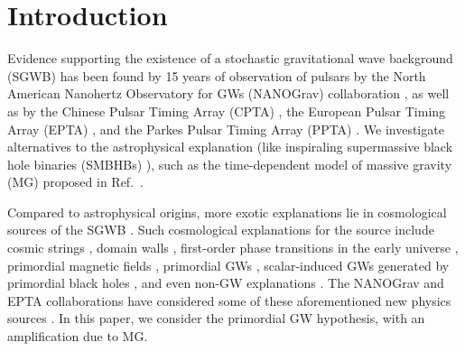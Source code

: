 \documentclass[prd,twocolumn,aps,psfig,nofootinbib,nobibnotes,superscriptaddress,preprintnumbers,times]{revtex4-2}
\begin{document}
\section{Introduction}
Evidence supporting the existence of a stochastic gravitational wave background (SGWB) has been found by 15 years of observation of pulsars by the North American Nanohertz Observatory for GWs (NANOGrav) collaboration \cite{Agazie:2023}, as well as by the Chinese Pulsar Timing Array (CPTA) \cite{Xu:2023wog}, the European Pulsar Timing Array (EPTA) \cite{EPTA:2023sfo, EPTA:2023akd, EPTA:2023fyk}, and the Parkes Pulsar Timing Array (PPTA) \cite{Zic:2023gta,Reardon:2023gzh}. We investigate alternatives to the astrophysical explanation (like inspiraling supermassive black hole binaries (SMBHBs) \cite{Rajagopal:1995,Jaffe:2002rt,Burke-Spolaor:2018bvk}), such as the time-dependent model of massive gravity (MG) proposed in Ref.\ \cite{Fujita:2018ehq}. 

Compared to astrophysical origins, more exotic explanations lie in cosmological sources of the SGWB  \cite{Maggiore:1999vm, Caprini:2018mtu, Chen:2021wdo, Wu:2021kmd, Chen:2021ncc, PPTA:2022eul, Wu:2023pbt, Wu:2023dnp, Madge:2023cak, Ellis:2023oxs}. Such cosmological explanations for the source include  cosmic strings \cite{Damour:2004kw,Siemens:2006yp, Chen:2022azo,Bian:2022tju}, domain walls \cite{Ferreira:2022zzo, Zhang:2023nrs}, first-order phase transitions in the early universe \cite{Kibble:1976sj, Vilenkin:1984ib,Caprini:2010xv, Kobakhidze:2017mru, Arunasalam:2017ajm, Xue:2021gyq, NANOGrav:2021flc, Moore:2021ibq, Addazi:2023jvg, Athron:2023xlk, Bringmann:2023opz, Ashoorioon:2022raz}, primordial magnetic fields \cite{Neronov:2020qrl,Brandenburg:2021tmp,RoperPol:2022iel,Kahniashvili:2021gym}, primordial GWs \cite{Grishchuk:1976, Grishchuk:1977zz, Starobinsky:1980te, Linde:1981mu, Fabbri:1983us, Grishchuk:2005qe, Lasky:2015lej, Kawai:2023nqs, Basilakos:2023xof, Basilakos:2023jvp}, scalar-induced GWs \cite{Tomita:1967non, Saito:2008jc, Young:2014ana, Yuan:2019udt, Yuan:2019wwo, Chen:2019xse, Cai:2019bmk, Yuan:2019fwv, Liu:2021jnw, Liu:2023ymk, Cai:2023dls, Choudhury:2023fjs, Choudhury:2023fwk, Bhattacharya:2023ysp, Choudhury:2023hfm, Kawai:2021edk} generated by primordial black holes \cite{Zeldovich:1967lct,Hawking:1971ei,Carr:1974nx,Chen:2018czv,Chen:2018rzo,Liu:2018ess,Liu:2019rnx,Chen:2019irf,Liu:2020cds,Wu:2020drm,Chen:2021nxo,Chen:2022fda,Chen:2022qvg,Liu:2022iuf,Zheng:2022wqo, Choudhury:2013woa, Franciolini:2023pbf}, and even non-GW explanations \cite{Chowdhury:2023xvy}. The NANOGrav and EPTA collaborations have considered some of these aforementioned new physics sources \cite{Afzal:2023,EPTA:2023xxk}.
In this paper, we consider the primordial GW hypothesis, with an amplification due to MG.
\end{document}
